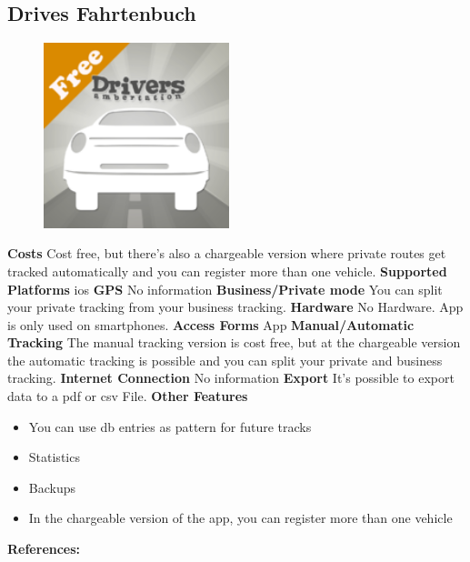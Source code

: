 \begin{singlespace}
\section{Drives Fahrtenbuch}
\begin{figure}
  \begin{center}
    \includegraphics[width=0.48\textwidth]{bilder/drives}
  \end{center}
\end{figure}
\textbf{Costs} Cost free, but there's also a chargeable version where private routes get tracked automatically and you can register more than one vehicle.
\newline\newline
\textbf{Supported Platforms} \gls{ios}
\newline\newline
\textbf{GPS} No information
\newline\newline
\textbf{Business/Private mode} You can split your private tracking from your business tracking.
\newline\newline
\textbf{Hardware} No Hardware. App is only used on smartphones.
\newline\newline
\textbf{Access Forms} App
\newline\newline
\textbf{Manual/Automatic Tracking} The manual tracking version is cost free, but at the chargeable version the automatic tracking is possible and you can split your private and business tracking.
\newline\newline
\textbf{Internet Connection} No information
\newline\newline
\textbf{Export} It’s possible to export data to a \gls{pdf} or \gls{csv} File.
\newline\newline
\textbf{Other Features} 
\begin{itemize}
\item You can use \gls{db} entries as pattern for future tracks
\item Statistics
\item Backups
\item In the chargeable version of the app, you can register more than one vehicle
\end{itemize}
\textbf{References:} \cite{Drives_Fahrtenbuch}
\newpage
\clearpageauthor

\end{singlespace}

